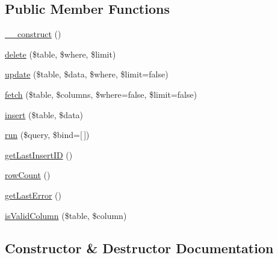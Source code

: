 \subsection*{Public Member Functions}
\begin{DoxyCompactItemize}
\item 
\hyperlink{class_david_fricker_1_1_data_abstracter_1_1_my_s_q_l_database_wrapper_a095c5d389db211932136b53f25f39685}{\+\_\+\+\_\+construct} ()
\item 
\hyperlink{class_david_fricker_1_1_data_abstracter_1_1_my_s_q_l_database_wrapper_af5ba80c2cc9f719100a159c8044959c4}{delete} (\$table, \$where, \$limit)
\item 
\hyperlink{class_david_fricker_1_1_data_abstracter_1_1_my_s_q_l_database_wrapper_a7fb294063cf3c7db8953cf241630d382}{update} (\$table, \$data, \$where, \$limit=false)
\item 
\hyperlink{class_david_fricker_1_1_data_abstracter_1_1_my_s_q_l_database_wrapper_ab2ab0042470a76f29458dff737c7769f}{fetch} (\$table, \$columns, \$where=false, \$limit=false)
\item 
\hyperlink{class_david_fricker_1_1_data_abstracter_1_1_my_s_q_l_database_wrapper_ae08b1d097cd6b6e5982ef0e0fd71de26}{insert} (\$table, \$data)
\item 
\hyperlink{class_david_fricker_1_1_data_abstracter_1_1_my_s_q_l_database_wrapper_ae568f0a5e65e08bb6de8e728846ad0c0}{run} (\$query, \$bind=\mbox{[}$\,$\mbox{]})
\item 
\hyperlink{class_david_fricker_1_1_data_abstracter_1_1_my_s_q_l_database_wrapper_afd1c56cdadff97f9d86095f745e95658}{get\+Last\+Insert\+ID} ()
\item 
\hyperlink{class_david_fricker_1_1_data_abstracter_1_1_my_s_q_l_database_wrapper_a82b073888555fc72e57142fe913db377}{row\+Count} ()
\item 
\hyperlink{class_david_fricker_1_1_data_abstracter_1_1_my_s_q_l_database_wrapper_a03582271ad4fdc21fa01a7901bf3605f}{get\+Last\+Error} ()
\item 
\hyperlink{class_david_fricker_1_1_data_abstracter_1_1_my_s_q_l_database_wrapper_aec4449be5da742126a819826b02be73b}{is\+Valid\+Column} (\$table, \$column)
\end{DoxyCompactItemize}


\subsection{Constructor \& Destructor Documentation}
\mbox{\label{class_david_fricker_1_1_data_abstracter_1_1_my_s_q_l_database_wrapper_a095c5d389db211932136b53f25f39685}} 
